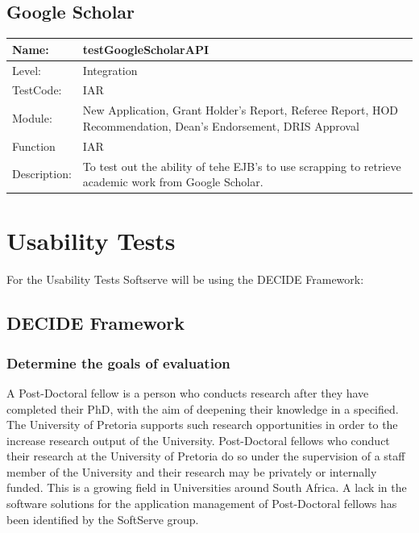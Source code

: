 \documentclass[12pt]{article}
\begin{document}
\subsection{Google Scholar}
\begin{center}
\begin{tabular}{|l|p{12cm}|}
\hline
 Name: & testGoogleScholarAPI \\
\hline
Level: & Integration \\
\hline
TestCode: & IAR \\
\hline
Module:&  New Application, Grant Holder's Report, Referee Report, HOD Recommendation, Dean's Endorsement, DRIS Approval\\
\hline
Function & IAR \\
\hline
Description: & To test out the ability of tehe EJB's to use scrapping to retrieve academic work from Google Scholar. \\
\hline
\end{tabular}
\end{center}

\newpage
\section{Usability Tests}
For the Usability Tests Softserve will be using the DECIDE Framework:
\subsection{DECIDE Framework}
\subsubsection{Determine the goals of evaluation}

A Post-Doctoral fellow is a person who conducts research after they have completed their PhD, with the aim of deepening their knowledge in a specified. The University of Pretoria supports such research opportunities in order to the increase research output of the University. Post-Doctoral fellows who conduct their research at the University of Pretoria do so under the supervision of a staff member of the University and their research may be privately or internally funded. This is a growing field in Universities around South Africa. A lack in the software solutions for the application management of Post-Doctoral fellows has been identified by the SoftServe group.
\end{document}
